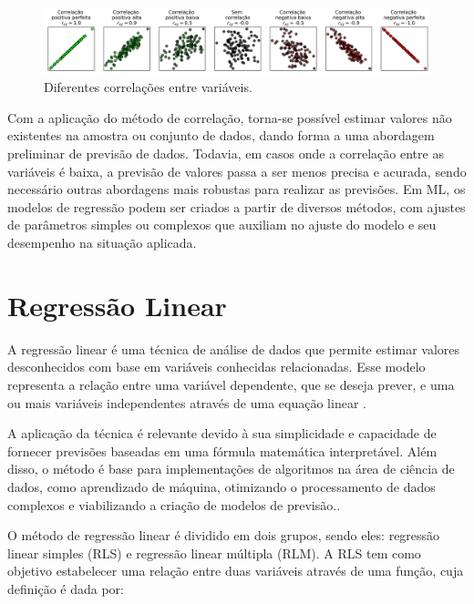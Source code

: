 \begin{figure}[H]
	\caption{\label{fig:correlacoes}Diferentes correlações entre variáveis.}
	\begin{center}
		\includegraphics[scale=0.4]{figuras/correlations.png}
	\end{center}
\end{figure}

Com a aplicação do método de correlação, torna-se possível estimar valores não existentes na amostra ou conjunto de dados, dando forma a uma abordagem preliminar de previsão de dados. Todavia, em casos onde a correlação entre as variáveis é baixa, a previsão de valores passa a ser menos precisa e acurada, sendo necessário outras abordagens mais robustas para realizar as previsões. Em ML, os modelos de regressão podem ser criados a partir de diversos métodos, com ajustes de parâmetros simples ou complexos que auxiliam no ajuste do modelo e seu desempenho na situação aplicada.

\section{Regressão Linear}

A regressão linear é uma técnica de análise de dados que permite estimar valores desconhecidos com base em variáveis conhecidas relacionadas. Esse modelo representa a relação entre uma variável dependente, que se deseja prever, e uma ou mais variáveis independentes através de uma equação linear \cite{aws2024}.

A aplicação da técnica é relevante devido à sua simplicidade e capacidade de fornecer previsões baseadas em uma fórmula matemática interpretável. Além disso, o método é base para implementações de algoritmos na área de ciência de dados, como aprendizado de máquina, otimizando o processamento de dados complexos e viabilizando a criação de modelos de previsão.\cite{aws2024}.

O método de regressão linear é dividido em dois grupos, sendo eles: regressão linear simples (RLS) e regressão linear múltipla (RLM). A RLS tem como objetivo estabelecer uma relação entre duas variáveis através de uma função, cuja definição é dada por:

